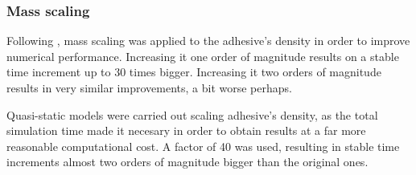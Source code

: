 \subsubsection{Mass scaling}
\label{sec:mass_scaling}
Following \citet{Scattina2011}, mass scaling was applied to the adhesive's density in order to improve numerical performance. Increasing it one order of magnitude results on a stable time increment up to 30 times bigger. Increasing it two orders of magnitude results in very similar improvements, a bit worse perhaps.

Quasi-static models were carried out scaling adhesive's density, as the total simulation time made it necesary in order to obtain results at a far more reasonable computational cost. A factor of 40 was used, resulting in stable time increments almost two orders of magnitude bigger than the original ones.

